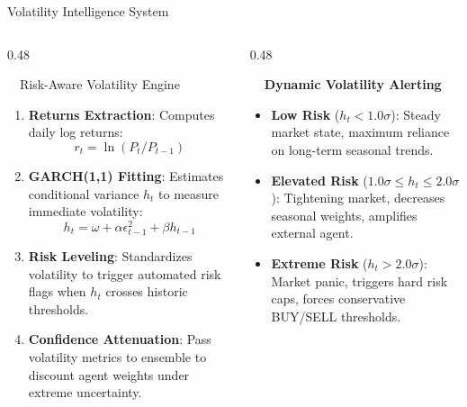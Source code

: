 \documentclass{beamer}
\begin{document}
\begin{frame}{Volatility Intelligence System}
\vspace{-0.2cm}

\begin{columns}[T]
    \begin{column}{0.48\textwidth}
        \begin{infocard}{~~Risk-Aware Volatility Engine}
            \fontsize{6.8pt}{8.5pt}\selectfont
            \begin{enumerate}\setlength\itemsep{3.5pt}\setlength\parskip{0pt}
                \item[\textbf{1.}] \textbf{Returns Extraction}: Computes daily log returns:
                \[ r_t = \ln(P_t / P_{t-1}) \]
                \item[\textbf{2.}] \textbf{GARCH(1,1) Fitting}: Estimates conditional variance $h_t$ to measure immediate volatility:
                \[ h_t = \omega + \alpha \epsilon_{t-1}^2 + \beta h_{t-1} \]
                \item[\textbf{3.}] \textbf{Risk Leveling}: Standardizes volatility to trigger automated risk flags when $h_t$ crosses historic thresholds.
                \item[\textbf{4.}] \textbf{Confidence Attenuation}: Pass volatility metrics to ensemble to discount agent weights under extreme uncertainty.
            \end{enumerate}
        \end{infocard}
    \end{column}
    
    \begin{column}{0.48\textwidth}
        \begin{smallcard}[0.98\textwidth, top=3pt, bottom=3pt, left=4pt, right=4pt, boxsep=0.5pt]
            \centering \textbf{\textcolor{primaryDark}{\small {}~~Dynamic Volatility Alerting}}
            \vspace{0.08cm}
            \fontsize{6.8pt}{8.2pt}\selectfont
            \begin{itemize}\setlength\itemsep{4pt}\setlength\parskip{0pt}
                \item \textbf{Low Risk} ($h_t < 1.0\sigma$): Steady market state, maximum reliance on long-term seasonal trends.
                \item \textbf{Elevated Risk} ($1.0\sigma \le h_t \le 2.0\sigma$): Tightening market, decreases seasonal weights, amplifies external agent.
                \item \textbf{Extreme Risk} ($h_t > 2.0\sigma$): Market panic, triggers hard risk caps, forces conservative BUY/SELL thresholds.
            \end{itemize}
        \end{smallcard}
    \end{column}
\end{columns}


\end{frame}
\end{document}
